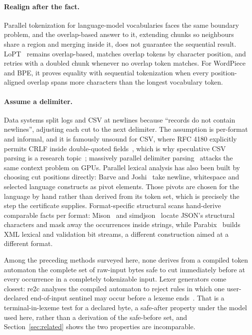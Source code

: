 \documentclass[11pt,a4paper]{article}
\theoremstyle{definition}
\theoremstyle{plain}
\begin{document}
\paragraph{Realign after the fact.} Parallel tokenization for language-model vocabularies faces the same boundary
problem, and the overlap-based answer to it, extending chunks so neighbours share a region and merging inside it, does
not guarantee the sequential result. LoPT~\cite{shao2026lopt} remains overlap-based, matches overlap tokens by
character position, and retries with a doubled chunk whenever no overlap token matches. For WordPiece and BPE, it
proves equality with sequential tokenization when every position-aligned overlap spans more characters than the
longest vocabulary token.

\paragraph{Assume a delimiter.} Data systems split logs and CSV at newlines because ``records do not contain
newlines'', adjusting each cut to the next delimiter. The assumption is per-format and informal, and it is famously
unsound for CSV, where RFC 4180 explicitly permits CRLF inside double-quoted fields~\cite{shafranovich2005csv}, which
is why speculative CSV parsing is a research topic~\cite{ge2019csv}; massively parallel delimiter
parsing~\cite{stehle2020parparaw} attacks the same context problem on GPUs. Parallel lexical analysis has also been
built by choosing cut positions directly: Barve and Joshi~\cite{barve2014parallel} take newline, whitespace and
selected language constructs as pivot elements. Those pivots are chosen for the language by hand rather than derived
from its token set, which is precisely the step the certificate supplies. Format-specific structural scans hand-derive
comparable facts per format: Mison~\cite{li2017mison} and simdjson~\cite{langdale2019simdjson} locate JSON's
structural characters and mask away the occurrences inside strings, while Parabix~\cite{cameron2008parabix} builds XML
lexical and validation bit streams, a different construction aimed at a different format.

Among the preceding methods surveyed here, none derives from a compiled token automaton the complete set of raw-input
bytes safe to cut immediately before at every occurrence in a completely tokenizable input. Lexer generators come
closest: re2c analyses the compiled automaton to reject rules in which one user-declared end-of-input sentinel may
occur before a lexeme ends~\cite{re2cdocs}. That is a terminal-in-lexeme test for a declared byte, a safe-after
property under the model used here, rather than a derivation of the safe-before set, and Section~\ref{sec:related}
shows the two properties are incomparable.
\end{document}
